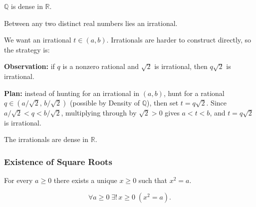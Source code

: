 \begin{theorem}
\label{thm:density-of-rationals}
$\mathbb{Q}$ is dense in $\mathbb{R}$.
\end{theorem}



\begin{corollary}
Between any two distinct real numbers lies an irrational.
\end{corollary}

\begin{remark*}
We want an irrational $t \in (a, b)$.
Irrationals are harder to construct directly, so the strategy is:

\medskip
\textbf{Observation:} if $q$ is a nonzero rational and $\sqrt{2}$ is irrational,
then $q\sqrt{2}$ is irrational.

\medskip
\textbf{Plan:} instead of hunting for an irrational in $(a, b)$, hunt for a
rational $q \in (a/\sqrt{2},\, b/\sqrt{2})$ (possible by Density of $\mathbb{Q}$),
then set $t = q\sqrt{2}$.
Since $a/\sqrt{2} < q < b/\sqrt{2}$, multiplying through by $\sqrt{2} > 0$ gives
$a < t < b$, and $t = q\sqrt{2}$ is irrational.
\end{remark*}

\begin{corollary}
\label{cor:density-of-irrationals}
The irrationals are dense in $\mathbb{R}$.
\end{corollary}


\subsubsection{Existence of Square Roots}

\begin{theorem}
\label{thm:existence-of-square-roots}
For every $a \ge 0$ there exists a unique $x \ge 0$ such that $x^2 = a$.
\end{theorem}

\begin{remark*}
\[
\forall a \ge 0\; \exists!\, x \ge 0\; (x^2 = a).
\]
\end{remark*}





